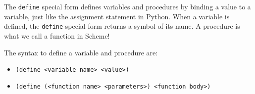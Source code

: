 
The \lstinline$define$ special form defines variables and procedures by binding a
value to a variable, just like the assignment statement in Python. When a
variable is defined, the \lstinline$define$ special form returns a symbol of its
name. A procedure is what we call a function in Scheme!

The syntax to define a variable and procedure are:
\begin{itemize}
    \item \lstinline$(define <variable name> <value>)$
    \item \lstinline$(define (<function name> <parameters>) <function body>)$
\end{itemize}
